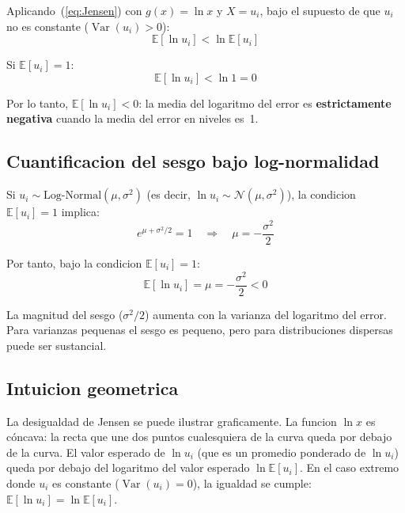 \documentclass[12pt, letterpaper]{article}
\theoremstyle{remark}
\newcommand{\E}{\mathbb{E}}
\newcommand{\Var}{\operatorname{Var}}
\begin{document}
Aplicando~(\ref{eq:Jensen}) con $g(x) = \ln x$ y $X = u_i$, bajo el supuesto
de que $u_i$ no es constante ($\Var(u_i) > 0$):
\begin{equation}
  \E[\ln u_i] < \ln \E[u_i]
  \label{eq:Jensen_aplicado}
\end{equation}

Si $\E[u_i] = 1$:
\begin{equation}
  \E[\ln u_i] < \ln 1 = 0
  \label{eq:Jensen_resultado}
\end{equation}

Por lo tanto, $\E[\ln u_i] < 0$: la media del logaritmo del error es
\textbf{estrictamente negativa} cuando la media del error en niveles es~1.

\subsection{Cuantificacion del sesgo bajo log-normalidad}

Si $u_i \sim \text{Log-Normal}(\mu, \sigma^2)$ (es decir, $\ln u_i \sim \mathcal{N}(\mu, \sigma^2)$),
la condicion $\E[u_i] = 1$ implica:
\begin{equation}
  e^{\mu + \sigma^2/2} = 1 \quad \Rightarrow \quad \mu = -\frac{\sigma^2}{2}
  \label{eq:mu_condicion}
\end{equation}

Por tanto, bajo la condicion $\E[u_i] = 1$:
\begin{equation}
  \E[\ln u_i] = \mu = -\frac{\sigma^2}{2} < 0
  \label{eq:media_lnu_negativa}
\end{equation}

La magnitud del sesgo ($\sigma^2/2$) aumenta con la varianza del logaritmo
del error. Para varianzas pequenas el sesgo es pequeno, pero para distribuciones
dispersas puede ser sustancial.

\subsection{Intuicion geometrica}

La desigualdad de Jensen se puede ilustrar graficamente. La funcion $\ln x$
es cóncava: la recta que une dos puntos cualesquiera de la curva queda por
debajo de la curva. El valor esperado de $\ln u_i$ (que es un promedio ponderado
de $\ln u_i$) queda por debajo del logaritmo del valor esperado $\ln\E[u_i]$.
En el caso extremo donde $u_i$ es constante ($\Var(u_i) = 0$), la igualdad
se cumple: $\E[\ln u_i] = \ln \E[u_i]$.
\end{document}
